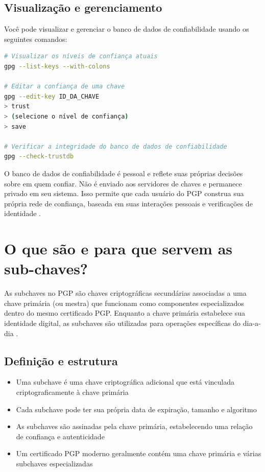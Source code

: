 \subsection{Visualização e gerenciamento}
Você pode visualizar e gerenciar o banco de dados de confiabilidade usando os seguintes comandos:

\begin{lstlisting}[language=bash]
# Visualizar os níveis de confiança atuais
gpg --list-keys --with-colons

# Editar a confiança de uma chave
gpg --edit-key ID_DA_CHAVE
> trust
> (selecione o nível de confiança)
> save

# Verificar a integridade do banco de dados de confiabilidade
gpg --check-trustdb
\end{lstlisting}

O banco de dados de confiabilidade é pessoal e reflete suas próprias decisões sobre em quem confiar. Não é enviado aos servidores de chaves e permanece privado em seu sistema. Isso permite que cada usuário do PGP construa sua própria rede de confiança, baseada em suas interações pessoais e verificações de identidade \cite{pgpbest} \cite{gnupgwot}.

\section{O que são e para que servem as sub-chaves?}

As subchaves no PGP são chaves criptográficas secundárias associadas a uma chave primária (ou mestra) que funcionam como componentes especializados dentro do mesmo certificado PGP. Enquanto a chave primária estabelece sua identidade digital, as subchaves são utilizadas para operações específicas do dia-a-dia \cite{gnupgdoc}.

\subsection{Definição e estrutura}
\begin{itemize}
    \item Uma subchave é uma chave criptográfica adicional que está vinculada criptograficamente à chave primária
    \item Cada subchave pode ter sua própria data de expiração, tamanho e algoritmo
    \item As subchaves são assinadas pela chave primária, estabelecendo uma relação de confiança e autenticidade
    \item Um certificado PGP moderno geralmente contém uma chave primária e várias subchaves especializadas
\end{itemize}

